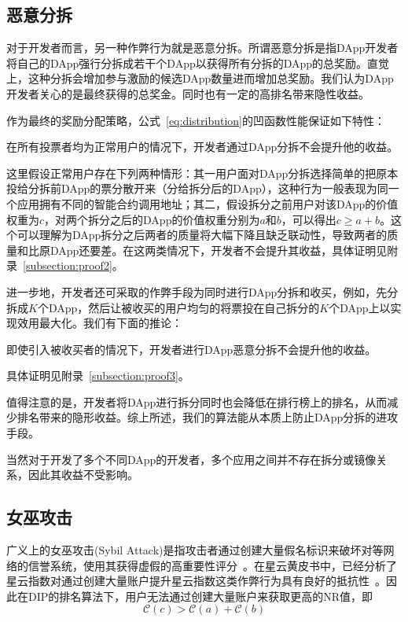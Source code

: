 \subsection{恶意分拆}
\label{subsec:5.2}

对于开发者而言，另一种作弊行为就是恶意分拆。所谓恶意分拆是指DApp开发者将自己的DApp强行分拆成若干个DApp以获得所有分拆的DApp的总奖励。直觉上，这种分拆会增加参与激励的候选DApp数量进而增加总奖励。我们认为DApp开发者关心的是最终获得的总奖金。同时也有一定的高排名带来隐性收益。

作为最终的奖励分配策略，公式~\ref{eq:distribution}的凹函数性能保证如下特性：
\begin{property}
\label{p2}
	在所有投票者均为正常用户的情况下，开发者通过DApp分拆不会提升他的收益。
\end{property}
这里假设正常用户存在下列两种情形：其一用户面对DApp分拆选择简单的把原本投给分拆前DApp的票分散开来（分给拆分后的DApp），这种行为一般表现为同一个应用拥有不同的智能合约调用地址；其二，假设拆分之前用户对该DApp的价值权重为$c$，对两个拆分之后的DApp的价值权重分别为$a$和$b$，可以得出$c \geq a+b$。这个可以理解为DApp拆分之后两者的质量将大幅下降且缺乏联动性，导致两者的质量和比原DApp还要差。在这两类情况下，开发者不会提升其收益，具体证明见附录~\ref{subsection:proof2}。

进一步地，开发者还可采取的作弊手段为同时进行DApp分拆和收买，例如，先分拆成$K$个DApp，然后让被收买的用户均匀的将票投在自己拆分的$K$个DApp上以实现效用最大化。我们有下面的推论：
\begin{corollary}
	\label{c1}
	即使引入被收买者的情况下，开发者进行DApp恶意分拆不会提升他的收益。
\end{corollary}
具体证明见附录~\ref{subsection:proof3}。

值得注意的是，开发者将DApp进行拆分同时也会降低在排行榜上的排名，从而减少排名带来的隐形收益。综上所述，我们的算法能从本质上防止DApp分拆的进攻手段。

当然对于开发了多个不同DApp的开发者，多个应用之间并不存在拆分或镜像关系，因此其收益不受影响。

\subsection{女巫攻击}
广义上的女巫攻击(Sybil Attack)是指攻击者通过创建大量假名标识来破坏对等网络的信誉系统，使用其获得虚假的高重要性评分~\cite{quercia2010sybil}。在星云黄皮书中，已经分析了星云指数对通过创建大量账户提升星云指数这类作弊行为具有良好的抵抗性~\cite{Nebulasyellowpaper}。因此在DIP的排名算法下，用户无法通过创建大量账户来获取更高的NR值，即%
$$\mathcal{C}(c)>\mathcal{C}(a)+\mathcal{C}(b)$$

